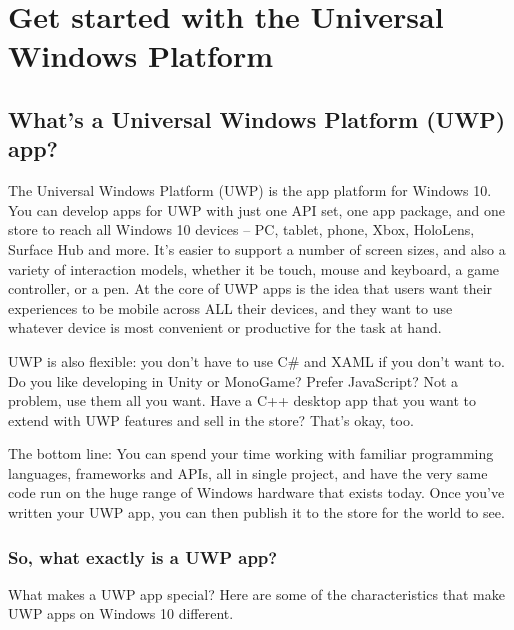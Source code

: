 \chapter{Get started with the Universal Windows Platform}

\section{What's a Universal Windows Platform (UWP) app?}

The Universal Windows Platform (UWP) is the app platform for Windows 10. You can develop apps for UWP with just one API set, one app package, and one store to reach all Windows 10 devices – PC, tablet, phone, Xbox, HoloLens, Surface Hub and more. It’s easier to support a number of screen sizes, and also a variety of interaction models, whether it be touch, mouse and keyboard, a game controller, or a pen. At the core of UWP apps is the idea that users want their experiences to be mobile across ALL their devices, and they want to use whatever device is most convenient or productive for the task at hand.

UWP is also flexible: you don't have to use C\# and XAML if you don't want to. Do you like developing in Unity or MonoGame? Prefer JavaScript? Not a problem, use them all you want. Have a C++ desktop app that you want to extend with UWP features and sell in the store? That's okay, too. 

The bottom line: You can spend your time working with familiar programming languages, frameworks and APIs, all in single project, and have the very same code run on the huge range of Windows hardware that exists today. Once you've written your UWP app, you can then publish it to the store for the world to see.

\subsection{So, what exactly is a UWP app?}
What makes a UWP app special? Here are some of the characteristics that make UWP apps on Windows 10 different.

